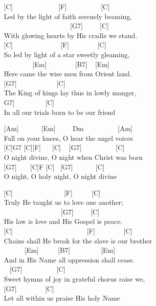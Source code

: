 \documentclass[
  letterpaper,
  twoside=false]{scrbook}
\begin{document}
{[}C{]} ~ ~ ~ ~ ~ ~ ~ ~{[}F{]} ~ ~ ~ ~ ~ ~{[}C{]}\\
Led by the light of faith serenely beaming,\\
\hspace*{0.333em} ~ ~ ~ ~ ~ ~ ~ ~ ~ ~ ~ ~{[}G7{]} ~ ~ ~{[}C{]}\\
With glowing hearts by His cradle we stand.\\
{[}C{]} ~ ~ ~ ~ ~ ~ ~ ~ {[}F{]} ~ ~ ~ ~ ~{[}C{]}\\
So led by light of a star sweetly gleaming,\\
\hspace*{0.333em} ~ ~ ~ ~ ~ {[}Em{]} ~ ~ ~ ~ ~{[}B7{]} ~ {[}Em{]}\\
Here came the wise men from Orient land.\\
\hspace*{0.333em} {[}G7{]} ~ ~ ~ ~ ~ ~ ~{[}C{]}\\
The King of kings lay thus in lowly manger,\\
\hspace*{0.333em}{[}G7{]} ~ ~ ~ ~ ~ {[}C{]}\\
In all our trials born to be our friend

{[}Am{]} ~ ~ ~ ~{[}Em{]} ~ ~ ~Dm ~ ~ ~ ~ ~ ~{[}Am{]}\\
Fall on your knees, O hear the angel voices\\
{[}C{]}G7 {[}C{]}{[}F{]} ~ ~{[}C{]} ~ {[}G7{]} ~ ~ ~ ~ ~ ~{[}C{]}\\
O night divine, O night when Christ was born\\
{[}G7{]} ~ ~ {[}C{]}F {[}C{]} ~{[}G7{]} ~ ~ ~ ~{[}C{]}\\
O night, O holy night, O night divine

{[}C{]} ~ ~ ~ ~ ~ ~ ~ ~ ~{[}F{]} ~ ~ ~ {[}C{]}\\
Truly He taught us to love one another;\\
\hspace*{0.333em} ~ ~ ~ ~ ~ ~ ~ ~ ~ ~ {[}G7{]} ~ ~ ~{[}C{]}\\
His law is love and His Gospel is peace.\\
{[}C{]} ~ ~ ~ ~ ~ ~ ~ ~ ~ ~ ~ ~ ~{[}F{]} ~ ~ ~ ~ ~{[}C{]}\\
Chains shall He break for the slave is our brother\\
\hspace*{0.333em} ~ ~ ~ ~{[}Em{]} ~ ~ ~ {[}B7{]} ~ ~ ~ ~ ~ {[}Em{]}\\
And in His Name all oppression shall cease.\\
\hspace*{0.333em} ~ {[}G7{]} ~ ~ ~ ~ ~ ~{[}C{]}\\
Sweet hymns of joy in grateful chorus raise we,\\
\hspace*{0.333em} {[}G7{]} ~ ~ ~ ~ ~{[}C{]}\\
Let all within us praise His holy Name
\end{document}
